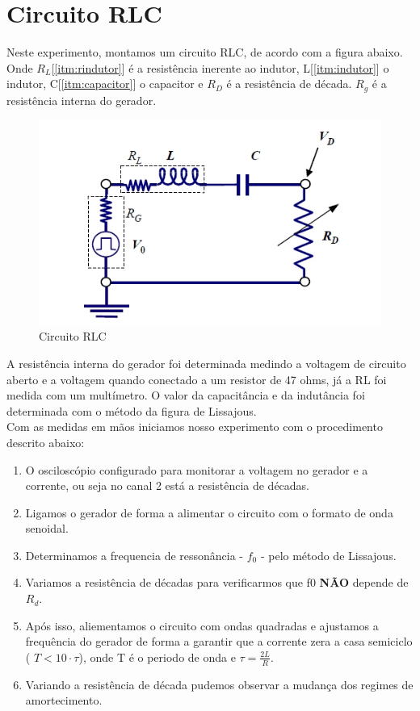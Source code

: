\documentclass[12pt,letterpaper]{article}
\begin{document}
\section{Circuito RLC}
Neste experimento, montamos um circuito RLC, de acordo com a figura abaixo. Onde $R_L$[\ref{itm:rindutor}] é a resistência inerente ao indutor, L[\ref{itm:indutor}] o indutor, C[\ref{itm:capacitor}] o capacitor e $R_D$ é a resistência de década. $R_g$ é a resistência interna do gerador.
\begin{figure}[!htb]
  \centering
  \label{imgrlc}
  \includegraphics[scale=0.5]{img/rlc.jpg}
  \caption{Circuito RLC}
\end{figure}
A resistência interna do gerador foi determinada medindo a voltagem de circuito aberto e a voltagem quando conectado a um resistor de 47 ohms, já a RL foi medida com um multímetro. O valor da capacitância e da indutância foi determinada com o método da figura de Lissajous.\\
Com as medidas em mãos iniciamos nosso experimento com o procedimento descrito abaixo:
\begin{enumerate}[I]
\item O osciloscópio configurado para monitorar a voltagem no gerador e a corrente, ou seja no canal 2 está a resistência de décadas.
\item Ligamos o gerador de forma a alimentar o circuito com o formato de onda senoidal.
\item Determinamos a frequencia de ressonância - $f_0$ - pelo método de Lissajous.
\item Variamos a resistência de décadas para verificarmos que f0 \textbf{NÃO} depende de $R_d$.
\item Após isso, aliementamos o circuito com ondas quadradas e ajustamos a frequência do gerador de forma a garantir que a corrente zera a casa semiciclo ( $ T < 10 \cdot \tau $), onde T é o periodo de onda e $\tau=\frac{2L}{R}$.
\item Variando a resistência de década pudemos observar a mudança dos regimes de amortecimento.
\end{enumerate}
\end{document}
